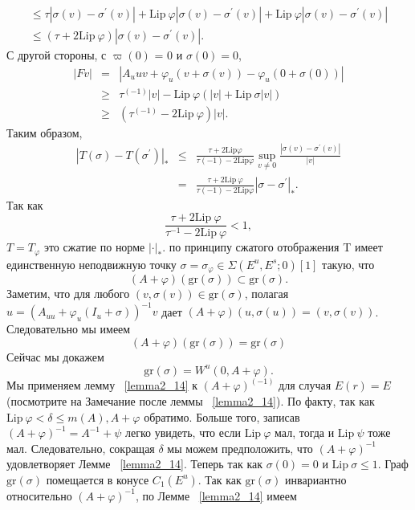 \begin{demo}
$$\begin{array}{lclll}
\leqslant \tau|\sigma (v) - \sigma^{\prime}(v)| + \mathrm {Lip} \ \varphi|\sigma(v) - \sigma^{\prime}(v)| + \mathrm {Lip} \ \varphi|\sigma(v) - \sigma^{\prime}(v)| \\
\leqslant  (\tau + 2 \mathrm{Lip} \ \varphi)|\sigma(v) - \sigma^{\prime} (v)|.
\end{array}
$$
С другой стороны, с $\varpi(0)$ = 0 и $\sigma(0) =0$,
$$
\begin{array}{rclll}
|Fv| & = & |A_uu v + \varphi_u(v + \sigma(v)) - \varphi_u(0 + \sigma(0))| \\
& \geqslant & \tau^(-1) |v| - \mathrm{Lip} \ \varphi(|v| + \mathrm{Lip} \ \sigma|v|) \\
& \geqslant & (\tau^(-1) - 2 \mathrm{Lip} \ \varphi)|v|.
\end{array}
$$
Таким образом,
$$
\begin{array}{rclll}
|T(\sigma) - T(\sigma^{\prime})|_* & \leqslant & \displaystyle\frac {\tau + 2 \mathrm{Lip} \varphi}{\tau(-1) - 2 \mathrm{Lip} \varphi} \sup\limits_{v \neq 0} \displaystyle \frac{|\sigma(v) - \sigma^{\prime}(v)|}{|v|} \\ 
& = &  \displaystyle\frac {\tau + 2 \mathrm{Lip} \ \varphi}{\tau(-1) - 2 \mathrm{Lip} \varphi} |\sigma - \sigma^{\prime}|_*.
\end{array}
$$
Так как
$$
\frac{\tau + 2 \mathrm{Lip} \ \varphi}{\tau^{-1} - 2 \mathrm{Lip} \ \varphi} < 1,
$$
$T = T_\varphi$ это сжатие по норме $|\cdot|_*$. по принципу сжатого отображения T имеет единственную неподвижную точку $\sigma = \sigma_\varphi \in \Sigma(E^u,E^s;0)[1]$ такую, что
$$
(A + \varphi)(\mathrm {gr}(\sigma)) \subset \mathrm{gr}(\sigma).
$$
Заметим, что для любого $(v, \sigma(v)) \in \mathrm{gr} (\sigma)$, полагая $u=(A_{uu}+\varphi_u(I_u+\sigma))^{-1}v$ дает $(A+\varphi)(u,\sigma(u))=(v,\sigma(v))$. Следовательно мы имеем 
$$
(A+\varphi)(\mathrm{gr}(\sigma))=\mathrm{gr}(\sigma)
$$
Сейчас мы докажем
$$
\mathrm{gr}(\sigma) = W^u(0,A + \varphi).
$$
Мы применяем лемму ~\ref{lemma2_14} к $(A + \varphi)^(-1)$  для случая $E(r) = E$ (посмотрите на Замечание после леммы ~\ref{lemma2_14}). По факту, так как $\mathrm{Lip} \ \varphi < \delta \leqslant m(A), A + \varphi$ обратимо. Больше того, записав $(A+\varphi)^{-1}=A^{-1}+\psi$ легко увидеть, что если $\mathrm{Lip} \ \varphi$ мал, тогда и $\mathrm{Lip} \ \psi$ тоже мал. Следовательно, сокращая $\delta$ мы можем предположить, что $(A+\varphi)^{-1}$ удовлетворяет Лемме ~\ref{lemma2_14}. Теперь так как $\sigma(0) = 0$ и $\mathrm{Lip} \ \sigma \leq 1$. Граф $\mathrm{gr}(\sigma)$ помещается в конусе $C_1(E^u)$. Так как $\mathrm{gr}(\sigma)$ инвариантно относительно $(A+\varphi)^{-1}$, по Лемме ~\ref{lemma2_14} имеем

\end{demo}
